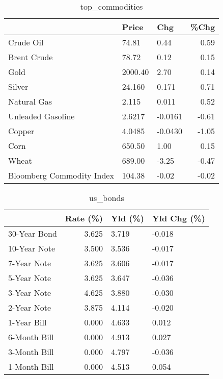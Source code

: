 \documentclass{article}%
\begin{document}
\begin{table}[htbp]%
\caption{top\_commodities}%
\centering%
\begin{adjustbox}{width=1\textwidth}%
\begin{tabular}{lllr}
\toprule
                          &   Price &     Chg &  \%Chg \\
\midrule
               Crude Oil  &   74.81 &    0.44 &  0.59 \\
             Brent Crude  &   78.72 &    0.12 &  0.15 \\
                    Gold  & 2000.40 &    2.70 &  0.14 \\
                  Silver  &  24.160 &   0.171 &  0.71 \\
             Natural Gas  &   2.115 &   0.011 &  0.52 \\
       Unleaded Gasoline  &  2.6217 & -0.0161 & -0.61 \\
                  Copper  &  4.0485 & -0.0430 & -1.05 \\
                    Corn  &  650.50 &    1.00 &  0.15 \\
                   Wheat  &  689.00 &   -3.25 & -0.47 \\
Bloomberg Commodity Index &  104.38 &   -0.02 & -0.02 \\
\bottomrule
\end{tabular}
%
\end{adjustbox}%
\end{table}

%


\begin{table}[htbp]%
\caption{us\_bonds}%
\centering%
\begin{adjustbox}{width=1\textwidth}%
\begin{tabular}{lrll}
\toprule
             &  Rate (\%) & Yld (\%) & Yld Chg (\%) \\
\midrule
30-Year Bond &     3.625 &   3.719 &      -0.018 \\
10-Year Note &     3.500 &   3.536 &      -0.017 \\
 7-Year Note &     3.625 &   3.606 &      -0.017 \\
 5-Year Note &     3.625 &   3.647 &      -0.036 \\
 3-Year Note &     4.625 &   3.880 &      -0.030 \\
 2-Year Note &     3.875 &   4.114 &      -0.020 \\
 1-Year Bill &     0.000 &   4.633 &       0.012 \\
6-Month Bill &     0.000 &   4.913 &       0.027 \\
3-Month Bill &     0.000 &   4.797 &      -0.036 \\
1-Month Bill &     0.000 &   4.513 &       0.054 \\
\bottomrule
\end{tabular}
%
\end{adjustbox}%
\end{table}
\end{document}
